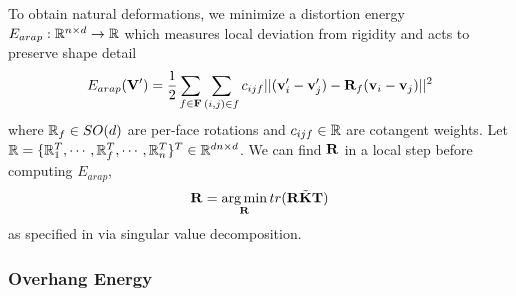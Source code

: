 To obtain natural deformations, we minimize a distortion energy $E_{arap}:  \mathbb{R}^{n \times d} \to \mathbb{R}$ which measures local deviation from rigidity and acts to preserve shape detail~\cite{sorkine_arap_2007}
\[
    E_{arap}(\mathbf{V}') = \frac{1}{2} \sum_{f\in \mathbf{F}} \sum_{(i,j)\in f} c_{ijf} || (\mathbf{v}_i' - \mathbf{v}_j') - \mathbf{R}_f(\mathbf{v}_i - \mathbf{v}_j) ||^2
\]
where $\mathbb{R}_f \in SO(d)$ are per-face rotations and $c_{ijf}\in \mathbb{R}$ are cotangent weights. Let $\mathbb{R} = \{\mathbb{R}_1^T, \cdots, \mathbb{R}_f^T, \cdots, \mathbb{R}_n^T \}^T \in \mathbb{R}^{dn \times d}$. We can find $\mathbf{R}$ in a local step before computing $E_{arap}$,
\[
    \mathbf{R} = \operatorname*{arg\,min}_{\mathbf{R}} tr(\mathbf{R}\tilde{\mathbf{K}}\mathbf{T})
\]
as specified in \cite{jacobson_fast_2012} via singular value decomposition.

    

\subsubsection*{Overhang Energy}

